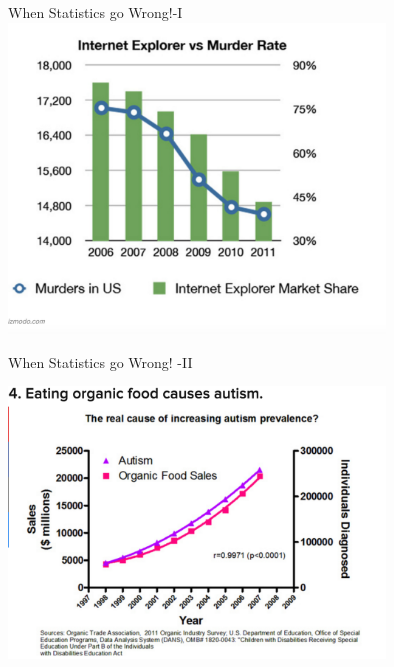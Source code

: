 \documentclass{beamer}\usepackage[]{graphicx}\usepackage[]{color}
\begin{document}
\begin{frame}[fragile]{When Statistics go Wrong!-I \;\;}
\includegraphics[width=10cm,keepaspectratio]{internet_murder.png}

\end{frame}


\begin{frame}[fragile]{When Statistics go Wrong! -II \;\;}

\includegraphics[width=10cm,keepaspectratio]{autism_organic.png}

\end{frame}
\end{document}
